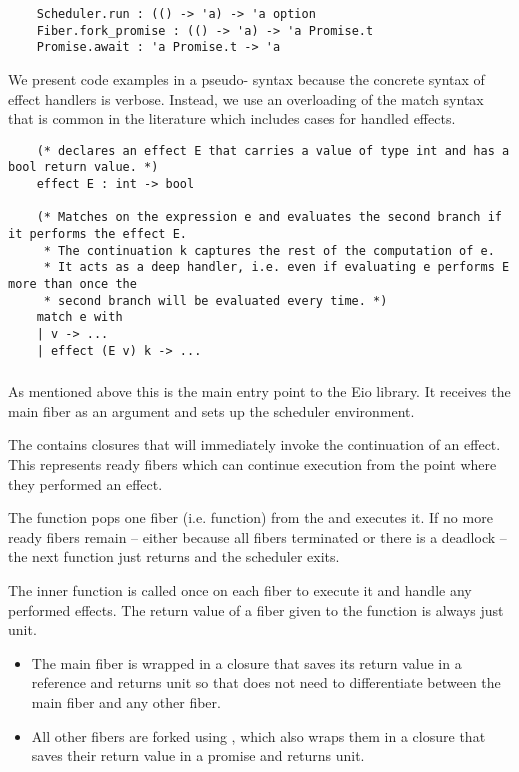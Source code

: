 \begin{verbatim}
    Scheduler.run : (() -> 'a) -> 'a option
    Fiber.fork_promise : (() -> 'a) -> 'a Promise.t
    Promise.await : 'a Promise.t -> 'a
\end{verbatim}

We present code examples in a pseudo-\ocf{} syntax because the concrete syntax of effect handlers is verbose.
Instead, we use an overloading of the match syntax that is common in the literature which includes cases for handled effects.

\begin{verbatim}
    (* declares an effect E that carries a value of type int and has a bool return value. *)
    effect E : int -> bool

    (* Matches on the expression e and evaluates the second branch if it performs the effect E.
     * The continuation k captures the rest of the computation of e.
     * It acts as a deep handler, i.e. even if evaluating e performs E more than once the 
     * second branch will be evaluated every time. *)
    match e with
    | v -> ...
    | effect (E v) k -> ...
\end{verbatim}

\subsubsection{}
\label{sec:sched-impl-run}

As mentioned above this is the main entry point to the Eio library.
It receives the main fiber as an argument and sets up the scheduler environment.

The  contains closures that will immediately invoke the continuation of an effect.
This represents ready fibers which can continue execution from the point where they performed an effect.

The  function pops one fiber (i.e. function) from the  and executes it.
If no more ready fibers remain -- either because all fibers terminated or there is a deadlock -- the next function just returns and the scheduler exits.

The inner  function is called once on each fiber to execute it and handle any performed effects.
The return value of a fiber given to the  function is always just unit.
\begin{itemize}
  \item The main fiber is wrapped in a closure that saves its return value in a reference and returns unit so that  does not need to differentiate between the main fiber and any other fiber.
  \item All other fibers are forked using , which also wraps them in a closure that saves their return value in a promise and returns unit.
\end{itemize}


